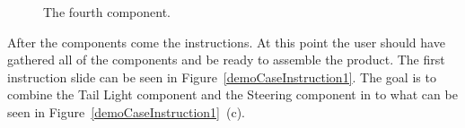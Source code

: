	\begin{figure}[H]%
		\centering
		\qquad
		\qquad
		\caption{The fourth component.}
		\label{demoCasePirate}
	\end{figure}

After the components come the instructions. At this point the user should have gathered all of the components and be ready to assemble the product. The first instruction slide can be seen in Figure~\ref{demoCaseInstruction1}. The goal is to combine the Tail Light component and the Steering component in to what can be seen in Figure~\ref{demoCaseInstruction1}~(c).

